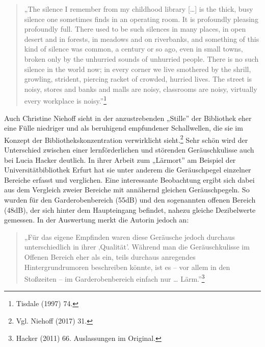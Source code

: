 \documentclass[a4paper,
fontsize=11pt,
oneside,
numbers=noperiodatend,
parskip=half-,
bibliography=totoc,
final
]{scrartcl}
\begin{document}
\begin{quote}
„The silence I remember from my childhood library {[}\ldots{]} is the
thick, busy silence one sometimes finds in an operating room. It is
profoundly pleasing profoundly full. There used to be such silences in
many places, in open desert and in forests, in meadows and on
riverbanks, and something of this kind of silence was common, a century
or so ago, even in small towns, broken only by the unhurried sounds of
unhurried people. There is no such silence in the world now; in every
corner we live smothered by the shrill, growling, strident, piercing
racket of crowded, hurried lives. The street is noisy, stores and banks
and malls are noisy, classrooms are noisy, virtually every workplace is
noisy.''\footnote{Tisdale (1997) 74.}
\end{quote}

Auch Christine Niehoff sieht in der anzustrebenden „Stille'' der
Bibliothek eher eine Fülle niedriger und als beruhigend empfundener
Schallwellen, die sie im Konzept der Bibliothekskonzentration
verwirklicht sieht.\footnote{Vgl. Niehoff (2017) 31.} Sehr schön wird
der Unterschied zwischen einer lernförderlichen und störenden
Geräuschkulisse auch bei Lucia Hacker deutlich. In ihrer Arbeit zum
„Lärmort'' am Beispiel der Universitätbibliothek Erfurt hat sie unter
anderem die Geräuschpegel einzelner Bereiche erfasst und verglichen.
Eine interessante Beobachtung ergibt sich dabei aus dem Vergleich zweier
Bereiche mit annähernd gleichen Geräuschpegeln. So wurden für den
Garderobenbereich (55dB) und den sogenannten offenen Bereich (48dB), der
sich hinter dem Haupteingang befindet, nahezu gleiche Dezibelwerte
gemessen. In der Auswertung merkt die Autorin jedoch an:

\begin{quote}
„Für das eigene Empfinden waren diese Geräusche jedoch durchaus
unterschiedlich in ihrer ‚Qualität'. Während man die Geräuschkulisse im
Offenen Bereich eher als ein, teils durchaus anregendes
Hintergrundrumoren beschreiben könnte, ist es -- vor allem in den
Stoßzeiten -- im Garderobenbereich einfach nur \ldots{}
Lärm.''\footnote{Hacker (2011) 66. Auslassungen im Original.}
\end{quote}
\end{document}
